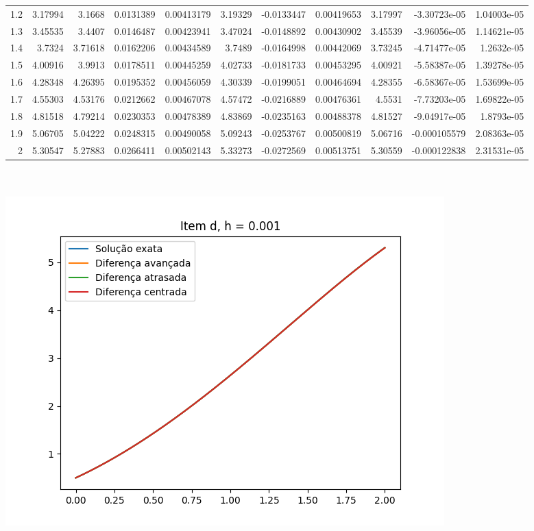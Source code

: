 {\begin{tabular}{rrrrrrrrrrr}
 1.2 & 3.17994  & 3.1668   &   0.0131389   &    0.00413179 & 3.19329  &  -0.0133447   &    0.00419653 & 3.17997  &  -3.30723e-05 &   1.04003e-05 \\
 1.3 & 3.45535  & 3.4407   &   0.0146487   &    0.00423941 & 3.47024  &  -0.0148892   &    0.00430902 & 3.45539  &  -3.96056e-05 &   1.14621e-05 \\
 1.4 & 3.7324   & 3.71618  &   0.0162206   &    0.00434589 & 3.7489   &  -0.0164998   &    0.00442069 & 3.73245  &  -4.71477e-05 &   1.2632e-05  \\
 1.5 & 4.00916  & 3.9913   &   0.0178511   &    0.00445259 & 4.02733  &  -0.0181733   &    0.00453295 & 4.00921  &  -5.58387e-05 &   1.39278e-05 \\
 1.6 & 4.28348  & 4.26395  &   0.0195352   &    0.00456059 & 4.30339  &  -0.0199051   &    0.00464694 & 4.28355  &  -6.58367e-05 &   1.53699e-05 \\
 1.7 & 4.55303  & 4.53176  &   0.0212662   &    0.00467078 & 4.57472  &  -0.0216889   &    0.00476361 & 4.5531   &  -7.73203e-05 &   1.69822e-05 \\
 1.8 & 4.81518  & 4.79214  &   0.0230353   &    0.00478389 & 4.83869  &  -0.0235163   &    0.00488378 & 4.81527  &  -9.04917e-05 &   1.8793e-05  \\
 1.9 & 5.06705  & 5.04222  &   0.0248315   &    0.00490058 & 5.09243  &  -0.0253767   &    0.00500819 & 5.06716  &  -0.000105579 &   2.08363e-05 \\
 2   & 5.30547  & 5.27883  &   0.0266411   &    0.00502143 & 5.33273  &  -0.0272569   &    0.00513751 & 5.30559  &  -0.000122838 &   2.31531e-05 \\
\hline
\end{tabular}
}
        \\
        \\
        \includegraphics{d_h_0.001.png}
